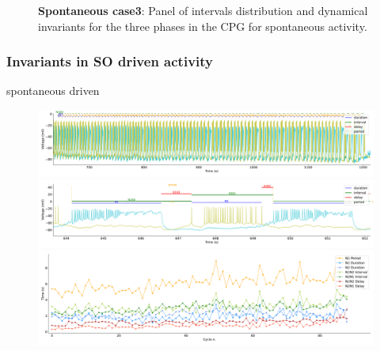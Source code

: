 \begin{figure}[htbp]
\begin{minipage}{0.9\textwidth}
\begin{minipage}[b]{0.53\textwidth}
\begin{minipage}[b]{\textwidth}
			\end{minipage}
		\end{minipage}
	\end{minipage}
	\caption{\textbf{Spontaneous case3}: Panel of intervals distribution and dynamical invariants for the three phases in the CPG for spontaneous activity.}
	\label{fig:prep3 invariants}
\end{figure}



\subsubsection{Invariants in SO driven activity}
\large{spontaneous driven}
 
\begin{figure}[htbp]
	\centering
	\begin{minipage}[b]{\textwidth}
		\centering
		\includegraphics[width=\textwidth,height=0.1\textheight]{./invariants/data/SUSSEX/prep4_so_driven_2/images/spontaneous_signal_intervals_zoom.pdf}
		\includegraphics[width=\textwidth]{./invariants/data/SUSSEX/prep4_so_driven_2/images/spontaneous_signal_intervals_cycle.pdf}
		\includegraphics[width=\textwidth]{./invariants/data/SUSSEX/prep4_so_driven_2/images/spontaneous_time_cycle.pdf}
	\end{minipage}
	\begin{minipage}{0.9\textwidth}
		\centering
		\begin{minipage}[b]{0.45\textwidth}

\end{minipage}
\end{minipage}
\end{figure}
